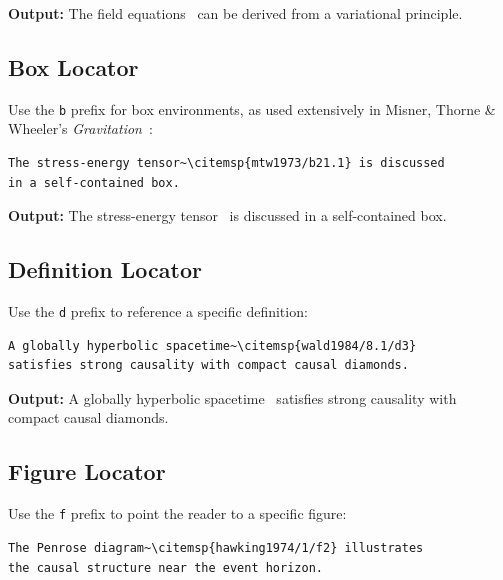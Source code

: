 \documentclass[11pt, a4paper]{article}
\begin{document}
\noindent\textbf{Output:} The field equations~ can be derived from a variational principle.


\subsection{Box Locator}

Use the \texttt{b} prefix for box environments, as used extensively in Misner, Thorne \& Wheeler's \textit{Gravitation}~\cite{mtw1973}:

\begin{tcolorbox}[colback=blue!3, colframe=blue!30, boxrule=0.5pt, arc=2pt, top=6pt, bottom=6pt, left=10pt, right=10pt]
\begin{verbatim}
The stress-energy tensor~\citemsp{mtw1973/b21.1} is discussed
in a self-contained box.
\end{verbatim}
\end{tcolorbox}

\noindent\textbf{Output:} The stress-energy tensor~ is discussed in a self-contained box.


\subsection{Definition Locator}

Use the \texttt{d} prefix to reference a specific definition:

\begin{tcolorbox}[colback=blue!3, colframe=blue!30, boxrule=0.5pt, arc=2pt, top=6pt, bottom=6pt, left=10pt, right=10pt]
\begin{verbatim}
A globally hyperbolic spacetime~\citemsp{wald1984/8.1/d3}
satisfies strong causality with compact causal diamonds.
\end{verbatim}
\end{tcolorbox}

\noindent\textbf{Output:} A globally hyperbolic spacetime~ satisfies strong causality with compact causal diamonds.


\subsection{Figure Locator}

Use the \texttt{f} prefix to point the reader to a specific figure:

\begin{tcolorbox}[colback=blue!3, colframe=blue!30, boxrule=0.5pt, arc=2pt, top=6pt, bottom=6pt, left=10pt, right=10pt]
\begin{verbatim}
The Penrose diagram~\citemsp{hawking1974/1/f2} illustrates
the causal structure near the event horizon.
\end{verbatim}
\end{tcolorbox}
\end{document}
